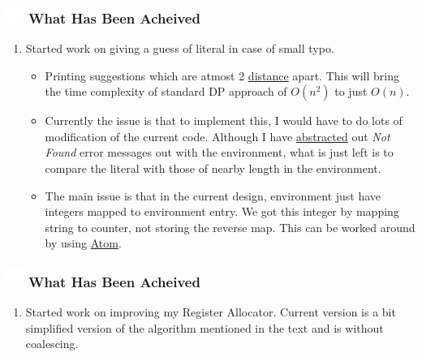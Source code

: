 \documentclass{beamer}
\newcommand{\ft}[1]{
  \frametitle{\includegraphics[height=0.55cm, width=0.55cm, keepaspectratio]{assets/tiger.png} #1}
}
\newcounter{saveenumi}
\newcommand{\seti}{\setcounter{saveenumi}{\value{enumi}}}
\newcommand{\conti}{\setcounter{enumi}{\value{saveenumi}}}
\begin{document}
\begin{frame}[fragile]
  \ft{What Has Been Acheived}
  \begin{enumerate}
    \conti
    \item Started work on giving a guess of literal in case of small typo. 
  \begin{itemize}
    \item Printing suggestions which are atmost 2 \href{https://en.wikipedia.org/wiki/Edit_distance}{distance} apart. This will bring the time complexity of standard DP approach of $O(n^2)$ to just $O(n)$. 
    \item Currently the issue is that to implement this, I would have to do lots of modification of the current code. Although I have \href{https://github.com/sourabh2311/btp/commit/8f27478a3c51b9e41bef68961a28c400d4ef29dd}{abstracted} out \textit{Not Found} error messages out with the environment, what is just left is to compare the literal with those of nearby length in the environment. 
    \item The main issue is that in the current design, environment just have integers mapped to environment entry. We got this integer by mapping string to counter, not storing the reverse map. This can be worked around by using \href{http://www.cs.utah.edu/~mjones/sml-nj-lib/atom.html}{Atom}.  
  \end{itemize}
    \seti
  \end{enumerate}
\end{frame}


\begin{frame}[fragile]
  \ft{What Has Been Acheived}
  \begin{enumerate}
    \conti
    \item Started work on improving my Register Allocator. Current version is a bit simplified version of the algorithm mentioned in the text and is without coalescing.
    \seti
  \end{enumerate}
\end{frame}
\end{document}
